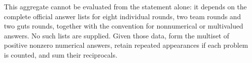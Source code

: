 This aggregate cannot be evaluated from the statement alone: it depends on the complete official answer lists for eight individual rounds, two team rounds and two guts rounds, together with the convention for nonnumerical or multivalued answers. No such lists are supplied. Given those data, form the multiset of positive nonzero numerical answers, retain repeated appearances if each problem is counted, and sum their reciprocals.
